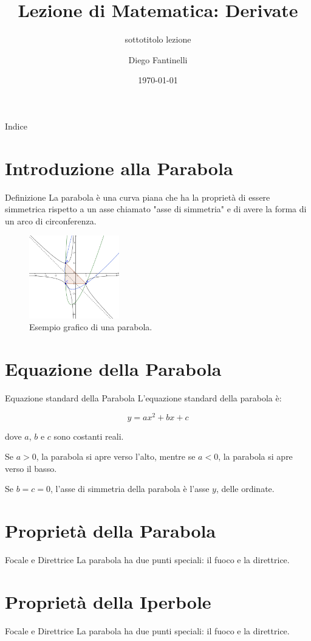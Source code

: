 \documentclass[aspectratio=169]{beamer}
\title[Titolo in basso a destra]{Lezione di Matematica: Derivate}
\subtitle{sottotitolo lezione}
\date{\today}
\author{Diego Fantinelli}
\institute{Matematica per il Liceo}
\begin{document}
\begin{frame}
  \maketitle
\end{frame}

\begin{frame}{Indice}
  \tableofcontents
\end{frame}

\section{Introduzione alla Parabola}

\begin{frame}{Definizione}
La parabola è una curva piana che ha la proprietà di essere simmetrica rispetto a un asse chiamato "asse di simmetria" e di avere la forma di un arco di circonferenza.
  
 \begin{figure}[htbp]
  \centering
    \includegraphics[width=0.35\textwidth]{parabola.png}
      \caption{Esempio grafico di una parabola.}
      \label{fig:parabola}
 \end{figure}  
\end{frame}

\section{Equazione della Parabola}

\begin{frame}{Equazione standard della Parabola}
  L'equazione standard della parabola è:
  
  $$y = ax^2 + bx + c$$
  
  dove $a$, $b$ e $c$ sono costanti reali.
  
  Se $a > 0$, la parabola si apre verso l'alto, mentre se $a < 0$, la parabola si apre verso il basso.
  
  Se $b = c = 0$, l'asse di simmetria della parabola è l'asse $y$, delle ordinate.
\end{frame}

\section{Proprietà della Parabola}

\begin{frame}{Focale e Direttrice}
  La parabola ha due punti speciali: il fuoco e la direttrice.
\end{frame}

\section{Proprietà della Iperbole}

\begin{frame}{Focale e Direttrice}
  La parabola ha due punti speciali: il fuoco e la direttrice.
\end{frame}
\end{document}
